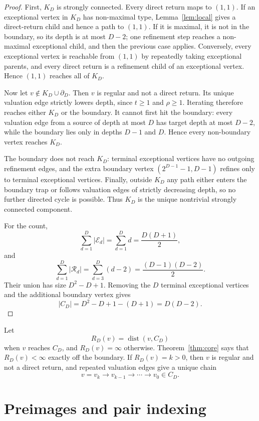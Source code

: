 \documentclass[11pt]{article}
\theoremstyle{definition}
\theoremstyle{remark}
\newcommand{\Ecal}{\mathcal E}
\newcommand{\Rcal}{\mathcal R}
\newcommand{\bdD}{\partial_D}
\newcommand{\dist}{\operatorname{dist}}
\begin{document}
\begin{proof}
First, $K_D$ is strongly connected.  Every direct return maps to $(1,1)$.  If an exceptional vertex in $K_D$ has non-maximal type, Lemma~\ref{lem:local} gives a direct-return child and hence a path to $(1,1)$.  If it is maximal, it is not in the boundary, so its depth is at most $D-2$; one refinement step reaches a non-maximal exceptional child, and then the previous case applies.  Conversely, every exceptional vertex is reachable from $(1,1)$ by repeatedly taking exceptional parents, and every direct return is a refinement child of an exceptional vertex.  Hence $(1,1)$ reaches all of $K_D$.

Now let $v\notin K_D\cup\bdD$.  Then $v$ is regular and not a direct return.  Its unique valuation edge strictly lowers depth, since $t\ge1$ and $\rho\ge1$.  Iterating therefore reaches either $K_D$ or the boundary.  It cannot first hit the boundary: every valuation edge from a source of depth at most $D$ has target depth at most $D-2$, while the boundary lies only in depths $D-1$ and $D$.  Hence every non-boundary vertex reaches $K_D$.

The boundary does not reach $K_D$: terminal exceptional vertices have no outgoing refinement edges, and the extra boundary vertex $(2^{D-1}-1,D-1)$ refines only to terminal exceptional vertices.  Finally, outside $K_D$ any path either enters the boundary trap or follows valuation edges of strictly decreasing depth, so no further directed cycle is possible.  Thus $K_D$ is the unique nontrivial strongly connected component.

For the count,
\[
\sum_{d=1}^D |\Ecal_d|=\sum_{d=1}^D d=\frac{D(D+1)}2,
\]
and
\[
\sum_{d=1}^D |\Rcal_d|=\sum_{d=3}^D(d-2)=\frac{(D-1)(D-2)}2.
\]
Their union has size $D^2-D+1$.  Removing the $D$ terminal exceptional vertices and the additional boundary vertex gives
\[
|C_D|=D^2-D+1-(D+1)=D(D-2).
\]
\end{proof}

Let
\[
R_D(v)=\dist(v,C_D)
\]
when $v$ reaches $C_D$, and $R_D(v)=\infty$ otherwise.  Theorem~\ref{thm:core} says that $R_D(v)<\infty$ exactly off the boundary.  If $R_D(v)=k>0$, then $v$ is regular and not a direct return, and repeated valuation edges give a unique chain
\[
v=v_k\to v_{k-1}\to\cdots\to v_0\in C_D.
\]

\section{Preimages and pair indexing}\label{sec:preimages}
\end{document}
